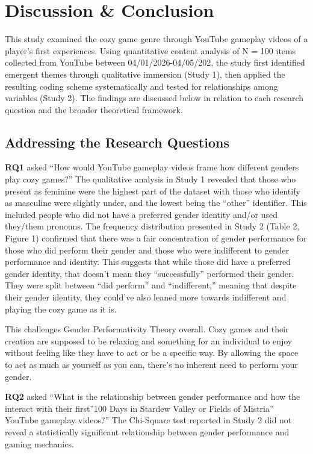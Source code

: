 \documentclass[
  12pt,
  letterpaper,
  DIV=11,
  numbers=noendperiod]{scrreprt}
\begin{document}
\chapter{Discussion \& Conclusion}\label{discussion-conclusion}

This study examined the cozy game genre through YouTube gameplay videos
of a player's first experiences. Using quantitative content analysis of
N = 100 items collected from YouTube between 04/01/2026-04/05/202, the
study first identified emergent themes through qualitative immersion
(Study 1), then applied the resulting coding scheme systematically and
tested for relationships among variables (Study 2). The findings are
discussed below in relation to each research question and the broader
theoretical framework.

\section{Addressing the Research
Questions}\label{addressing-the-research-questions}

\textbf{RQ1} asked ``How would YouTube gameplay videos frame how
different genders play cozy games?'' The qualitative analysis in Study 1
revealed that those who present as feminine were the highest part of the
dataset with those who identify as masculine were slightly under, and
the lowest being the ``other'' identifier. This included people who did
not have a preferred gender identity and/or used they/them pronouns. The
frequency distribution presented in Study 2 (Table 2, Figure 1)
confirmed that there was a fair concentration of gender performance for
those who did perform their gender and those who were indifferent to
gender performance and identity. This suggests that while those did have
a preferred gender identity, that doesn't mean they ``successfully''
performed their gender. They were split between ``did perform'' and
``indifferent,'' meaning that despite their gender identity, they
could've also leaned more towards indifferent and playing the cozy game
as it is.

This challenges Gender Performativity Theory overall. Cozy games and
their creation are supposed to be relaxing and something for an
individual to enjoy without feeling like they have to act or be a
specific way. By allowing the space to act as much as yourself as you
can, there's no inherent need to perform your gender.

\textbf{RQ2} asked ``What is the relationship between gender performance
and how the interact with their first''100 Days in Stardew Valley or
Fields of Mistria'' YouTube gameplay videos?'' The Chi-Square test
reported in Study 2 did not reveal a statistically significant
relationship between gender performance and gaming mechanics.
\end{document}
